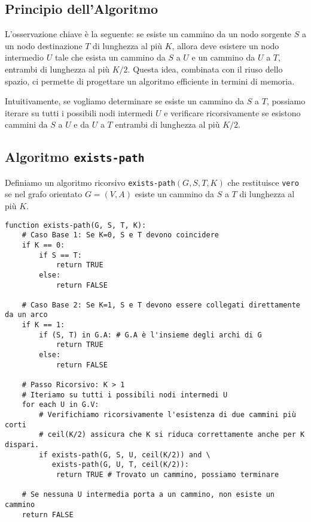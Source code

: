 \documentclass[a4paper, 11pt]{book} %
\theoremstyle{definition}
\begin{document}
\subsection{Principio dell'Algoritmo}
L'osservazione chiave è la seguente: se esiste un cammino da un nodo sorgente $S$ a un nodo destinazione $T$ di lunghezza al più $K$, allora deve esistere un nodo intermedio $U$ tale che esista un cammino da $S$ a $U$ e un cammino da $U$ a $T$, entrambi di lunghezza al più $K/2$. Questa idea, combinata con il riuso dello spazio, ci permette di progettare un algoritmo efficiente in termini di memoria.

Intuitivamente, se vogliamo determinare se esiste un cammino da $S$ a $T$, possiamo iterare su tutti i possibili nodi intermedi $U$ e verificare ricorsivamente se esistono cammini da $S$ a $U$ e da $U$ a $T$ entrambi di lunghezza al più $K/2$.

\subsection{Algoritmo \texttt{exists-path}}
Definiamo un algoritmo ricorsivo \texttt{exists-path}$(G, S, T, K)$ che restituisce \texttt{vero} se nel grafo orientato $G=(V,A)$ esiste un cammino da $S$ a $T$ di lunghezza al più $K$.

\begin{verbatim}
function exists-path(G, S, T, K):
    # Caso Base 1: Se K=0, S e T devono coincidere
    if K == 0:
        if S == T:
            return TRUE
        else:
            return FALSE

    # Caso Base 2: Se K=1, S e T devono essere collegati direttamente da un arco
    if K == 1:
        if (S, T) in G.A: # G.A è l'insieme degli archi di G
            return TRUE
        else:
            return FALSE
    
    # Passo Ricorsivo: K > 1
    # Iteriamo su tutti i possibili nodi intermedi U
    for each U in G.V:
        # Verifichiamo ricorsivamente l'esistenza di due cammini più corti
        # ceil(K/2) assicura che K si riduca correttamente anche per K dispari.
        if exists-path(G, S, U, ceil(K/2)) and \
           exists-path(G, U, T, ceil(K/2)):
            return TRUE # Trovato un cammino, possiamo terminare
            
    # Se nessuna U intermedia porta a un cammino, non esiste un cammino
    return FALSE
\end{verbatim}
\end{document}
